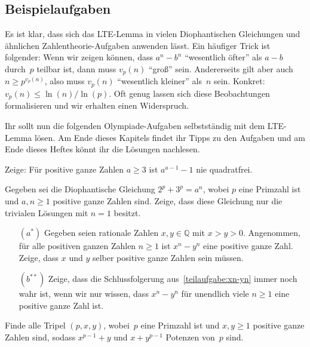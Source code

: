 \subsection*{Beispielaufgaben}
Es ist klar, dass sich das LTE-Lemma in vielen Diophantischen Gleichungen und ähnlichen Zahlentheorie-Aufgaben anwenden lässt. Ein häufiger Trick ist folgender: Wenn wir zeigen können, dass $a^n-b^n$ \enquote{wesentlich öfter} als $a-b$ durch~$p$ teilbar ist, dann muss $v_p(n)$ \enquote{groß} sein. Andererseits gilt aber auch $n\geqslant p^{v_p(n)}$, also muss $v_p(n)$ \enquote{wesentlich kleiner} als~$n$ sein. Konkret: $v_p(n)\leqslant \ln(n)/\ln(p)$. Oft genug lassen sich diese Beobachtungen formalisieren und wir erhalten einen Widerspruch.

Ihr sollt nun die folgenden Olympiade-Aufgaben selbstständig mit dem LTE-Lemma lösen. Am Ende dieses Kapitels findet ihr Tipps zu den Aufgaben und am Ende dieses Heftes könnt ihr die Lösungen nachlesen.

\begin{aufgabe*}\label{aufgabe:NieQuadratfrei}
	Zeige: Für positive ganze Zahlen $a\geqslant 3$ ist $a^{a-1}-1$ nie quadratfrei.
\end{aufgabe*}
\begin{aufgabe*}\label{aufgabe:2p3pan}
	Gegeben sei die Diophantische Gleichung $2^p+3^p=a^n$, wobei $p$ eine Primzahl ist und $a,n\geqslant 1$ positive ganze Zahlen sind. Zeige, dass diese Gleichung nur die trivialen Lösungen mit $n=1$ besitzt.
\end{aufgabe*}
\begin{aufgabe*}[**]\leavevmode\label{aufgabe:xn-yn}
	\begin{enumerate}[label={$(\alph*)$},ref={$(\alph*)$}]
		\item[$(a^*)$] Gegeben seien rationale Zahlen $x,y\in\mathbb Q$ mit $x>y>0$. Angenommen, für alle positiven ganzen Zahlen $n\geqslant 1$ ist $x^n-y^n$ eine positive ganze Zahl. Zeige, dass $x$ und $y$ selber positive ganze Zahlen sein müssen.\label{teilaufgabe:xn-yn}
		\item[$(b^{**})$] Zeige, dass die Schlussfolgerung aus~\ref{teilaufgabe:xn-yn} immer noch wahr ist, wenn wir nur wissen, dass $x^n-y^n$ für unendlich viele $n\geqslant 1$ eine positive ganze Zahl ist.\label{teilaufgabe:xn-ynEndlichViele}
	\end{enumerate}
\end{aufgabe*}
\begin{aufgabe*}[**]\label{aufgabe:IMOSL2014N5}
	Finde alle Tripel $(p,x,y)$, wobei~$p$ eine Primzahl ist und $x,y\geqslant 1$ positive ganze Zahlen sind, sodass $x^{p-1}+y$ und $x+y^{p-1}$ Potenzen von~$p$ sind.
\end{aufgabe*}


